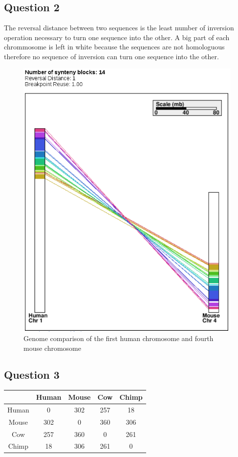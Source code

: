 \documentclass[]{article}
\theoremstyle{definition}
\begin{document}
\subsection{Question 2}
The reversal distance between two sequences is the least number of inversion operation necessary to turn one sequence into the other. A big part of each chrommosome is left in white because the sequences are not homologuous therefore no sequence of inversion can turn one sequence into the other. 
\begin{figure}[h!!]
	\centering
	\includegraphics*[height = 0.5\textheight]{../H1_M4.png}
	\caption{\label{h1_m4} Genome comparison of the first human chromosome and fourth mouse chromosome }
\end{figure}

\subsection{Question 3}

\begin{tabular}{|*{5}{c|}}
	\hline
	   & Human  & Mouse  & Cow  & Chimp \\
	\hline
	Human  & 0  & 302  & 257  & 18 \\
	\hline
	Mouse  & 302  & 0  & 360 & 306 \\
	\hline
	Cow  & 257  & 360 & 0 & 261 \\
	\hline
	Chimp  & 18 & 306 & 261 & 0 \\
	\hline
	
\end{tabular}
\end{document}
